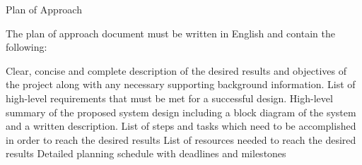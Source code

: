 Plan of Approach

The plan of approach document must be written in English and contain the following:

    Clear, concise and complete description of the desired results and objectives
    of the project along with any necessary supporting background
    information.
    List of high-level requirements that must be met for a successful design.
    High-level summary of the proposed system design including a block diagram
    of the system and a written description.
    List of steps and tasks which need to be accomplished in order to reach
    the desired results
    List of resources needed to reach the desired results
    Detailed planning schedule with deadlines and milestones
